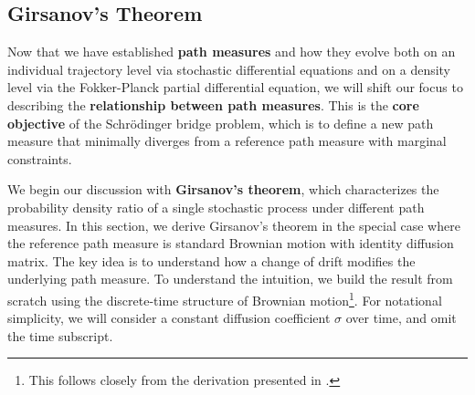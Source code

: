 \documentclass{article}
\newcommand{\boldtext}[1]{\textbf{\textcolor{MyGreen}{#1}}}
\begin{document}
\subsection{Girsanov's Theorem}
\label{subsec:girsanov}
Now that we have established \textbf{path measures} and how they evolve both on an individual trajectory level via stochastic differential equations and on a density level via the Fokker-Planck partial differential equation, we will shift our focus to describing the \textbf{relationship between path measures}. This is the \textbf{core objective} of the Schrödinger bridge problem, which is to define a new path measure that minimally diverges from a reference path measure with marginal constraints.

We begin our discussion with \boldtext{Girsanov's theorem}, which characterizes the probability density ratio of a single stochastic process under different path measures. In this section, we derive Girsanov’s theorem in the special case where the reference path measure is standard Brownian motion with identity diffusion matrix. The key idea is to understand how a change of drift modifies the underlying path measure. To understand the intuition, we build the result from scratch using the discrete-time structure of Brownian motion\footnote{This follows closely from the derivation presented in \citet{sarkka2019applied}.}. For notational simplicity, we will consider a constant diffusion coefficient $\sigma$ over time, and omit the time subscript. 
\end{document}
